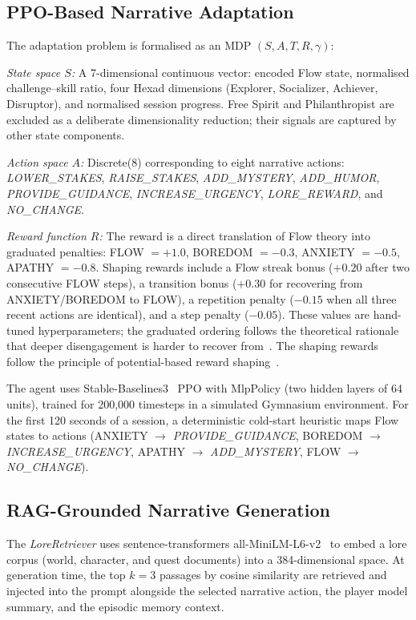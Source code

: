 \documentclass[conference]{IEEEtran}
\begin{document}
\subsection{PPO-Based Narrative Adaptation}

The adaptation problem is formalised as an MDP $(S, A, T, R, \gamma)$:

\textit{State space $S$:} A 7-dimensional continuous vector: encoded Flow state, normalised challenge--skill ratio, four Hexad dimensions (Explorer, Socializer, Achiever, Disruptor), and normalised session progress. Free Spirit and Philanthropist are excluded as a deliberate dimensionality reduction; their signals are captured by other state components.

\textit{Action space $A$:} Discrete(8) corresponding to eight narrative actions: \textit{LOWER\_STAKES}, \textit{RAISE\_STAKES}, \textit{ADD\_MYSTERY}, \textit{ADD\_HUMOR}, \textit{PROVIDE\_GUIDANCE}, \textit{INCREASE\_URGENCY}, \textit{LORE\_REWARD}, and \textit{NO\_CHANGE}.

\textit{Reward function $R$:} The reward is a direct translation of Flow theory into graduated penalties: FLOW $= +1.0$, BOREDOM $= -0.3$, ANXIETY $= -0.5$, APATHY $= -0.8$. Shaping rewards include a Flow streak bonus ($+0.20$ after two consecutive FLOW steps), a transition bonus ($+0.30$ for recovering from ANXIETY/BOREDOM to FLOW), a repetition penalty ($-0.15$ when all three recent actions are identical), and a step penalty ($-0.05$). These values are hand-tuned hyperparameters; the graduated ordering follows the theoretical rationale that deeper disengagement is harder to recover from~\cite{csikszentmihalyi1990flow, chen2007flow}. The shaping rewards follow the principle of potential-based reward shaping~\cite{ng1999policy}.

The agent uses Stable-Baselines3~\cite{raffin2021stable} PPO with MlpPolicy (two hidden layers of 64 units), trained for 200,000 timesteps in a simulated Gymnasium environment. For the first 120 seconds of a session, a deterministic cold-start heuristic maps Flow states to actions (ANXIETY $\to$ \textit{PROVIDE\_GUIDANCE}, BOREDOM $\to$ \textit{INCREASE\_URGENCY}, APATHY $\to$ \textit{ADD\_MYSTERY}, FLOW $\to$ \textit{NO\_CHANGE}).

\subsection{RAG-Grounded Narrative Generation}

The \textit{LoreRetriever} uses sentence-transformers all-MiniLM-L6-v2~\cite{wang2020minilm} to embed a lore corpus (world, character, and quest documents) into a 384-dimensional space. At generation time, the top $k=3$ passages by cosine similarity are retrieved and injected into the prompt alongside the selected narrative action, the player model summary, and the episodic memory context.
\end{document}
